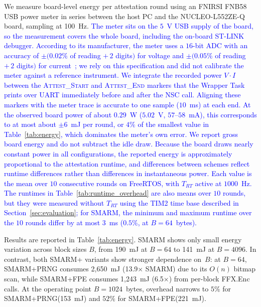 \documentclass[journal]{IEEEtran}
\newcommand\ben[1]{\textcolor{blue}{#1}}
\newcommand{\rtsmarm}{SMARM+\xspace}
\newcommand{\rtsmarmone}{SMARM+PRNG\xspace}
\newcommand{\rtsmarmtwo}{SMARM+FPE\xspace}
\begin{document}
We measure board-level energy per attestation round using 
an FNIRSI FNB58 USB power meter in series between the host 
PC and the NUCLEO-L552ZE-Q board, sampling at 100~Hz. \ben{The meter sits on the $5$~V USB supply of the board, so the measurement covers the whole board, including the on-board ST-LINK debugger.
According to its manufacturer, the meter uses a $16$-bit ADC with an accuracy of $\pm(0.02\%$ of reading $+\,2$ digits$)$ for voltage and $\pm(0.05\%$ of reading $+\,2$ digits$)$ for current~\cite{fnb58}; we rely on this specification and did not calibrate the meter against a reference instrument.
We integrate the recorded power $V \cdot I$ between the \textsc{Attest\_Start} and \textsc{Attest\_End} markers that the Wrapper Task prints over UART immediately before and after the NSC call.
Aligning these markers with the meter trace is accurate to one sample ($10$~ms) at each end.
At the observed board power of about $0.29$~W ($5.02$~V, $57$--$58$~mA), this corresponds to at most about $\pm 6$~mJ per round, or $4\%$ of the smallest value in Table~\ref{tab:energy}, which dominates the meter's own error.
We report gross board energy and do not subtract the idle draw.
Because the board draws nearly constant power in all configurations, the reported energy is approximately proportional to the attestation runtime, and differences between schemes reflect runtime differences rather than differences in instantaneous power.
Each value is the mean over $10$ consecutive rounds on FreeRTOS, with $T_{RT}$ active at $1000$~Hz.
The runtimes in Table~\ref{tab:runtime_overhead} are also means over $10$ rounds, but they were measured without $T_{RT}$ using the TIM2 time base described in Section~\ref{sec:evaluation}; for SMARM, the minimum and maximum runtime over the $10$ rounds differ by at most $3$~ms ($0.5\%$, at $B = 64$~bytes).}

%
Results are reported in Table~\ref{tab:energy}.
SMARM shows only small energy variation across block sizes $B$, from 190~mJ at $B=64$ to 141~mJ at $B=4096$.
In contrast, both \rtsmarm variants show stronger dependence on~$B$: 
at $B = 64$, \rtsmarmone consumes 2{,}650~mJ 
(13.9$\times$ SMARM) due to its $O(n)$ bitmap scan, 
while \rtsmarmtwo consumes 1{,}243~mJ (6.5$\times$) 
from per-block \textsf{FFX.Enc} calls.
At the operating point $B = 1024$~bytes, overhead 
narrows to $5\%$ for \rtsmarmone (153~mJ) and 
$52\%$ for \rtsmarmtwo (221~mJ).
\end{document}
